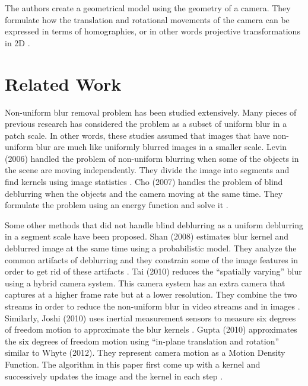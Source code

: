 \documentclass[10pt,twocolumn,letterpaper]{article}
\begin{document}
The authors create a geometrical model using the geometry of a camera. They formulate how the translation and rotational movements of the camera can be expressed in terms of homographies, or in other words projective transformations in 2D \cite{whyte2012non}. 





\section{Related Work}

Non-uniform blur removal problem has been studied extensively. Many pieces of previous research has considered the problem as a subset of uniform blur in a patch scale. In other words, these studies assumed that images that have non-uniform blur are much like uniformly blurred images in a smaller scale. Levin (2006) handled the problem of non-uniform blurring when some of the objects in the scene are moving independently. They divide the image into segments and find kernels using image statistics  \cite{levin2006blind}. Cho \etal (2007) handles the problem of blind deblurring when the objects and the camera moving at the same time. They formulate the problem using an energy function and solve it \cite{cho2007removing}. 

Some other methods that did not handle blind deblurring as a uniform deblurring in a segment scale have been proposed. Shan \etal (2008) estimates blur kernel and deblurred image at the same time using a probabilistic model. They analyze the common artifacts of deblurring and they constrain some of the image features in order to get rid of these artifacts \cite{shan2008high}. Tai \etal (2010) reduces the ``spatially varying'' blur using a hybrid camera system. This camera system has an extra camera that captures at a higher frame rate but at a lower resolution. They combine the two streams in order to reduce the non-uniform blur in video streams and in images \cite{tai2010correction}. Similarly, Joshi \etal (2010) uses inertial measurement sensors to measure six degrees of freedom motion to approximate the blur kernels \cite{joshi2010image}. Gupta \etal (2010) approximates the six degrees of freedom motion using ``in-plane translation and rotation'' similar to Whyte \etal (2012). They represent camera motion as a Motion Density Function. The algorithm in this paper first come up with a kernel and successively updates the image and the kernel in each step \cite{gupta2010single}.
\end{document}
